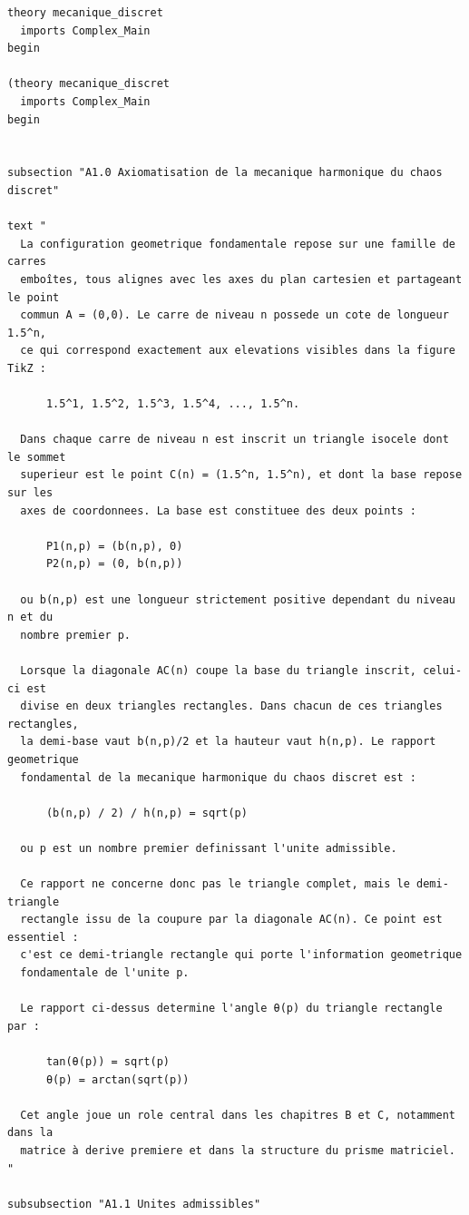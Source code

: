\documentclass[12pt,a4paper]{article}
\begin{document}
\begin{lstlisting}[style=isabellegray]
theory mecanique_discret
  imports Complex_Main
begin

(theory mecanique_discret
  imports Complex_Main
begin


subsection "A1.0 Axiomatisation de la mecanique harmonique du chaos discret"

text "
  La configuration geometrique fondamentale repose sur une famille de carres
  emboîtes, tous alignes avec les axes du plan cartesien et partageant le point
  commun A = (0,0). Le carre de niveau n possede un cote de longueur 1.5^n,
  ce qui correspond exactement aux elevations visibles dans la figure TikZ :

      1.5^1, 1.5^2, 1.5^3, 1.5^4, ..., 1.5^n.

  Dans chaque carre de niveau n est inscrit un triangle isocele dont le sommet
  superieur est le point C(n) = (1.5^n, 1.5^n), et dont la base repose sur les
  axes de coordonnees. La base est constituee des deux points :

      P1(n,p) = (b(n,p), 0)
      P2(n,p) = (0, b(n,p))

  ou b(n,p) est une longueur strictement positive dependant du niveau n et du
  nombre premier p.

  Lorsque la diagonale AC(n) coupe la base du triangle inscrit, celui-ci est
  divise en deux triangles rectangles. Dans chacun de ces triangles rectangles,
  la demi-base vaut b(n,p)/2 et la hauteur vaut h(n,p). Le rapport geometrique
  fondamental de la mecanique harmonique du chaos discret est :

      (b(n,p) / 2) / h(n,p) = sqrt(p)

  ou p est un nombre premier definissant l'unite admissible.

  Ce rapport ne concerne donc pas le triangle complet, mais le demi-triangle
  rectangle issu de la coupure par la diagonale AC(n). Ce point est essentiel :
  c'est ce demi-triangle rectangle qui porte l'information geometrique
  fondamentale de l'unite p.

  Le rapport ci-dessus determine l'angle θ(p) du triangle rectangle par :

      tan(θ(p)) = sqrt(p)
      θ(p) = arctan(sqrt(p))

  Cet angle joue un role central dans les chapitres B et C, notamment dans la
  matrice à derive premiere et dans la structure du prisme matriciel.
"

subsubsection "A1.1 Unites admissibles"


\end{lstlisting}
\end{document}
